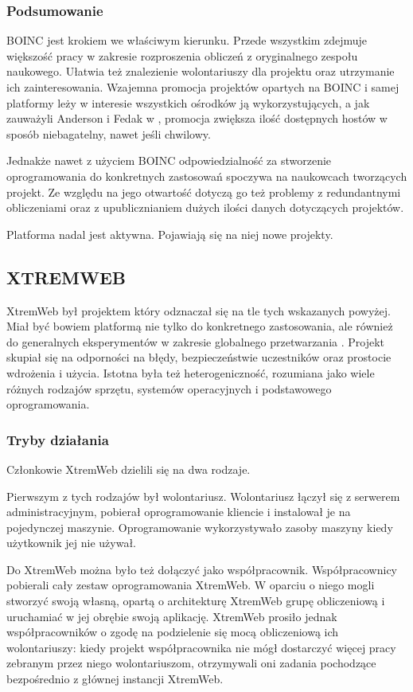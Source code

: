 \documentclass[12pt,a4paper,twoside]{article}
\begin{document}
\subsubsection{Podsumowanie}

BOINC jest krokiem we właściwym kierunku. Przede wszystkim zdejmuje większość pracy w zakresie rozproszenia obliczeń z oryginalnego zespołu naukowego. Ułatwia też znalezienie wolontariuszy dla projektu oraz utrzymanie ich zainteresowania. Wzajemna promocja projektów opartych na BOINC i samej platformy leży w interesie wszystkich ośrodków ją wykorzystujących, a jak zauważyli Anderson i Fedak w \cite{computational}, promocja zwiększa ilość dostępnych hostów w sposób niebagatelny, nawet jeśli chwilowy.

Jednakże nawet z użyciem BOINC odpowiedzialność za stworzenie oprogramowania do konkretnych zastosowań spoczywa na naukowcach tworzących projekt. Ze względu na jego otwartość dotyczą go też problemy z redundantnymi obliczeniami oraz z upublicznianiem dużych ilości danych dotyczących projektów.

Platforma nadal jest aktywna. Pojawiają się na niej nowe projekty.

\subsection{XTREMWEB}

XtremWeb był projektem który odznaczał się na tle tych wskazanych powyżej. Miał być bowiem platformą nie tylko do konkretnego zastosowania, ale również do generalnych eksperymentów w zakresie globalnego przetwarzania \cite{xtremweb}. Projekt skupiał się na odporności na błędy, bezpieczeństwie uczestników oraz prostocie wdrożenia i użycia. Istotna była też heterogeniczność, rozumiana jako wiele różnych rodzajów sprzętu, systemów operacyjnych i podstawowego oprogramowania.

\subsubsection{Tryby działania}

Członkowie XtremWeb dzielili się na dwa rodzaje. 

Pierwszym z tych rodzajów był wolontariusz. Wolontariusz łączył się z serwerem administracyjnym, pobierał oprogramowanie kliencie i instalował je na pojedynczej maszynie. Oprogramowanie wykorzystywało zasoby maszyny kiedy użytkownik jej nie używał.

Do XtremWeb można było też dołączyć jako współpracownik. Współpracownicy pobierali cały zestaw oprogramowania XtremWeb. W oparciu o niego mogli stworzyć swoją własną, opartą o architekturę XtremWeb grupę obliczeniową i uruchamiać w jej obrębie swoją aplikację. XtremWeb prosiło jednak współpracowników o zgodę na podzielenie się mocą obliczeniową ich wolontariuszy: kiedy projekt współpracownika nie mógł dostarczyć więcej pracy zebranym przez niego wolontariuszom, otrzymywali oni zadania pochodzące bezpośrednio z głównej instancji XtremWeb.
\end{document}
